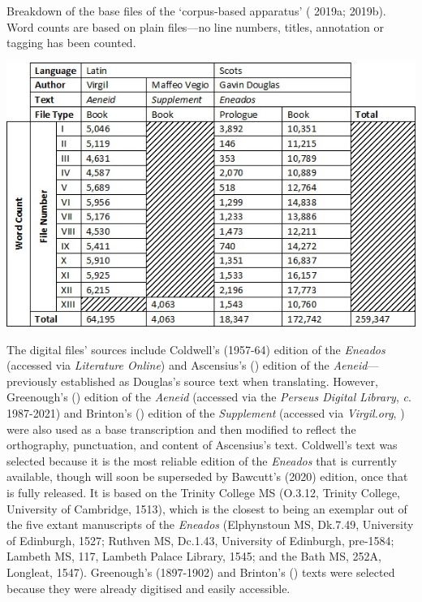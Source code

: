 \documentclass{dhbenelux}
\begin{document}
\begin{table}[h]
\centering
\caption{Breakdown of the base files of the ‘corpus-based apparatus’ (\citeauthor{bushnell2019v} 2019a; 2019b).  Word counts are based on plain files—no line numbers, titles, annotation or tagging has been counted.\\}
\label{tab:groups}
\includegraphics[width=1\linewidth]{Images/Table1.jpg}
\end{table}

\pagebreak
The digital files' sources include Coldwell's (1957-64) edition of the
\emph{Eneados} (accessed via \emph{Literature Online}) and Ascensius's
(\citeyear{virgil1501}) edition of the \emph{Aeneid}---previously established as
Douglas's source text when translating. However, Greenough's (\citeyear{virgil1897})
edition of the \emph{Aeneid} (accessed via the \emph{Perseus Digital
Library}, \citeauthor{crane1987} \emph{c}. 1987-2021) and Brinton's
(\citeyear{vegio1930}) edition of the \emph{Supplement}
(accessed via \emph{Virgil.org}, \citeauthor{wilsonokamura2014} \citeyear{wilsonokamura2014}) were also used as a base transcription
and then modified to reflect the orthography, punctuation, and content
of Ascensius's text. Coldwell's text was selected because it is the most
reliable edition of the \emph{Eneados} that is currently available,
though will soon be superseded by Bawcutt's (2020) edition, once that is
fully released. It is based on the Trinity College MS (O.3.12, Trinity
College, University of Cambridge, 1513), which is the closest to being
an exemplar out of the five extant manuscripts of the \emph{Eneados}
(Elphynstoun MS, Dk.7.49, University of Edinburgh, 1527; Ruthven MS,
Dc.1.43, University of Edinburgh, pre-1584; Lambeth MS, 117, Lambeth
Palace Library, 1545; and the Bath MS, 252A, Longleat, 1547).
Greenough's (1897-1902) and Brinton's (\citeyear{vegio1930}) texts were selected because they
were already digitised and easily accessible.
\end{document}
